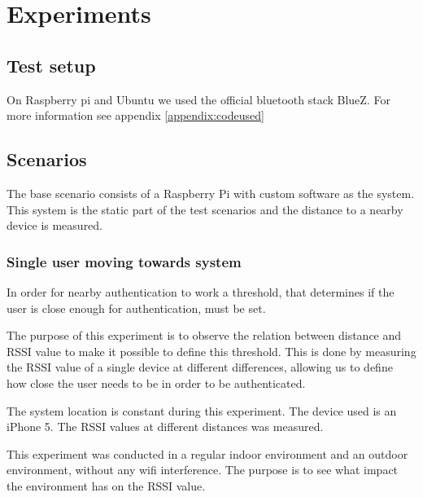 \section{Experiments}

\subsection{Test setup}

On Raspberry pi and Ubuntu we used the official bluetooth stack BlueZ.
For more information see appendix \ref{appendix:codeused}

\subsection{Scenarios}

The base scenario consists of a Raspberry Pi with custom software as the system.
This system is the static part of the test scenarios and the distance to a nearby device is measured.



\subsubsection{Single user moving towards system}
\label{section:MovingTowardsSystem}
In order for nearby authentication to work a threshold, that determines if the user is close enough for authentication, must be set.

The purpose of this experiment is to observe the relation between distance and RSSI value to make it possible to  define  this threshold. This is done by measuring the RSSI value of a single device at different differences, allowing us to define how close the user needs to be in order to be authenticated. 

The system location is constant during this experiment. The device used is an iPhone 5. The RSSI values at different distances was measured. 

This experiment was conducted in a regular indoor environment and an outdoor environment, without any wifi interference. The purpose is to see what impact the environment has on the RSSI value.


